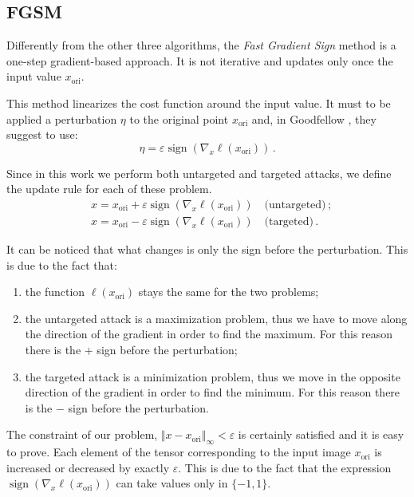 \documentclass[10pt,twocolumn,letterpaper, english]{article}
\newcommand{\sign}{\mathop{\mathrm{sign}}}
\theoremstyle{definition}
\theoremstyle{plain}
\theoremstyle{plain}
\theoremstyle{plain}
\theoremstyle{plain}
\theoremstyle{remark}
\theoremstyle{remark}
\theoremstyle{definition}
\theoremstyle{definition}
\theoremstyle{definition}
\theoremstyle{definition}
\renewcommand{\epsilon}{\varepsilon}
\begin{document}
\subsection{FGSM}

Differently from the other three algorithms, the \textit{Fast Gradient Sign} method is a one-step gradient-based approach. 
It is not iterative and updates only once the input value $x_{\text{ori}}$. 

This method linearizes the cost function around the input value. 
It must to be applied a perturbation $\eta$ to the original point $x_{\text{ori}}$ and, in Goodfellow \cite{goodfellow}, they suggest to use: 
\begin{equation*}
    \eta = \epsilon \sign (\nabla_x \ell(x_{\text{ori}})) \,.
\end{equation*}

Since in this work we perform both untargeted and targeted attacks, we define the update rule for each of these problem. 
\begin{align*}
    &x= x_{\text{ori}} + \epsilon \sign (\nabla_x \ell(x_{\text{ori}})) \quad \text{(untargeted)} \,;\\
    &x= x_{\text{ori}} - \epsilon \sign (\nabla_x \ell(x_{\text{ori}})) \quad \text{(targeted)} \,. 
\end{align*}

It can be noticed that what changes is only the sign before the perturbation. 
This is due to the fact that: 
\begin{enumerate}
    \item the function $\ell(x_{\text{ori}})$ stays the same for the two problems; 
    \item the untargeted attack is a maximization problem, thus we have to move along the direction of the gradient in order to find the maximum. For this reason there is the $+$ sign before the perturbation; 
    \item the targeted attack is a minimization problem, thus we move in the opposite direction of the gradient in order to find the minimum. For this reason there is the $-$ sign before the perturbation. 
\end{enumerate}

The constraint of our problem, $\Vert x - x_{\text{ori}} \Vert_\infty  < \epsilon$ is certainly satisfied and it is easy to prove. 
Each element of the tensor corresponding to the input image $x_{\text{ori}}$ is increased or decreased by exactly $\epsilon$. 
This is due to the fact that the expression  $\sign (\nabla_x \ell(x_\text{ori}))$  can take values only in $\{-1, 1\}$. 
\end{document}
